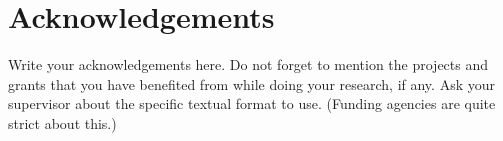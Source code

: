 \chapter*{Acknowledgements}
\setlength{\parskip}{1em}

Write your acknowledgements here. Do not forget to mention the projects and grants that you have benefited from while doing your research, if any. Ask your supervisor about the specific textual format to use. (Funding agencies are quite strict about this.)

\setlength{\parskip}{0em}